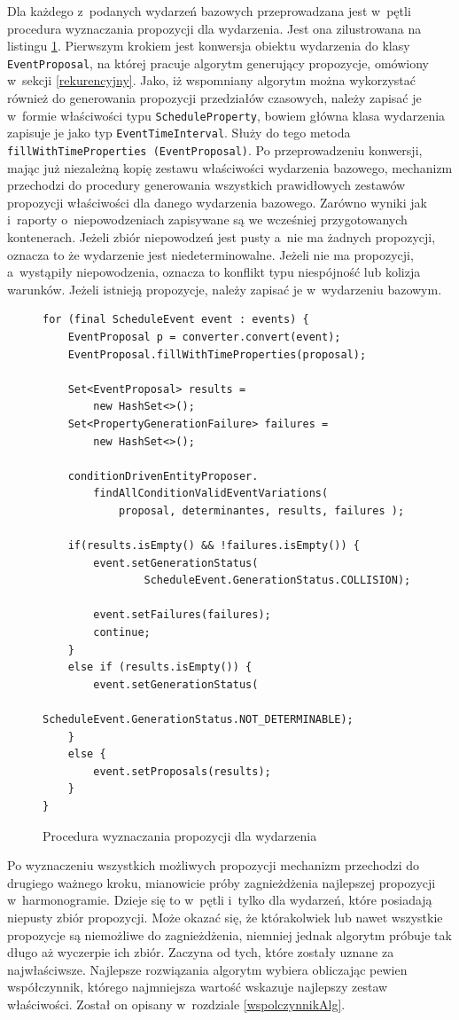\documentclass[a4paper]{book}
\begin{document}
{Dla każdego z~podanych wydarzeń bazowych przeprowadzana jest w~pętli procedura wyznaczania propozycji dla wydarzenia. Jest ona zilustrowana na listingu \ref{id:fig:listing:autogeneration1}. Pierwszym krokiem jest konwersja obiektu wydarzenia do klasy \lstinline|EventProposal|, na której pracuje algorytm generujący propozycje, omówiony w~sekcji \ref{rekurencyjny}. Jako, iż wspomniany algorytm można wykorzystać również do generowania propozycji przedziałów czasowych, należy zapisać je w~formie właściwości typu \lstinline|ScheduleProperty|, bowiem główna klasa wydarzenia zapisuje je jako typ \lstinline|EventTimeInterval|. Służy do tego metoda \lstinline|fillWithTimeProperties (EventProposal)|. Po przeprowadzeniu konwersji, mając już niezależną kopię zestawu właściwości wydarzenia bazowego, mechanizm przechodzi do procedury generowania wszystkich prawidłowych zestawów propozycji właściwości dla danego wydarzenia bazowego. Zarówno wyniki jak i~raporty o~niepowodzeniach zapisywane są we wcześniej przygotowanych kontenerach. Jeżeli zbiór niepowodzeń jest pusty a~nie ma żadnych propozycji, oznacza to że wydarzenie jest niedeterminowalne. Jeżeli nie ma propozycji, a~wystąpiły niepowodzenia, oznacza to konflikt typu niespójność lub kolizja warunków. Jeżeli istnieją propozycje, należy zapisać je w~wydarzeniu bazowym.
\begin{figure}
\begin{lstlisting}
for (final ScheduleEvent event : events) {
	EventProposal p = converter.convert(event);
	EventProposal.fillWithTimeProperties(proposal);
	
	Set<EventProposal> results = 
		new HashSet<>();
	Set<PropertyGenerationFailure> failures = 
		new HashSet<>();
		
	conditionDrivenEntityProposer.
		findAllConditionValidEventVariations(
			proposal, determinantes, results, failures );
	
	if(results.isEmpty() && !failures.isEmpty()) {
		event.setGenerationStatus(
				ScheduleEvent.GenerationStatus.COLLISION);
			
		event.setFailures(failures);
		continue;
	}
	else if (results.isEmpty()) {
		event.setGenerationStatus(
				ScheduleEvent.GenerationStatus.NOT_DETERMINABLE);
	}
	else {
		event.setProposals(results);
	}
}
\end{lstlisting}
\caption{Procedura wyznaczania propozycji dla wydarzenia}
\label{id:fig:listing:autogeneration1}
\end{figure}

Po wyznaczeniu wszystkich możliwych propozycji mechanizm przechodzi do drugiego ważnego kroku, mianowicie próby zagnieżdżenia najlepszej propozycji w~harmonogramie. Dzieje się to w~pętli i~tylko dla wydarzeń, które posiadają niepusty zbiór propozycji. Może okazać się, że którakolwiek lub nawet wszystkie propozycje są niemożliwe do zagnieżdżenia, niemniej jednak algorytm próbuje tak długo aż wyczerpie ich zbiór. Zaczyna  od tych, które zostały uznane za najwłaściwsze. Najlepsze rozwiązania algorytm wybiera obliczając pewien współczynnik, którego najmniejsza wartość wskazuje najlepszy zestaw właściwości. Został on opisany w~rozdziale \ref{wspolczynnikAlg}.

}
\end{document}

